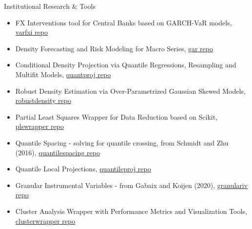 \documentclass[usegeometry, 10pt, a4paper]{cv} %
\begin{document}
\begin{rubriquetableau}[0.95\textwidth]{Institutional Research \& Tools}\\
  \vspace{-0.8cm}
  
\begin{itemize}
\item FX Interventions tool for Central Banks based on GARCH-VaR models, \href{https://github.com/romainlafarguette/varfxi}{varfxi repo} 
\item Density Forecasting and Risk Modeling for Macro Series, \href{https://github.com/IMFGAR/GaR}{gar repo}
\item Conditional Density Projection via Quantile Regressions, Resampling and Multifit Models, \href{https://github.com/romainlafarguette/gar}{quantproj repo}
\item Robust Density Estimation via Over-Parametrized Gaussian Skewed Models, \href{https://github.com/romainlafarguette/robustdensity}{robustdensity repo}
\item Partial Least Squares Wrapper for Data Reduction based on Scikit, \href{https://github.com/romainlafarguette/plswrapper}{plswrapper repo}
\item Quantile Spacing - solving for quantile crossing, from Schmidt and Zhu (2016), \href{https://github.com/romainlafarguette/quantilespacing}{quantilespacing repo}
\item Quantile Local Projections, \href{https://github.com/romainlafarguette/quantileproj}{quantileproj repo}
\item Granular Instrumental Variables - from Gabaix and Koijen (2020), \href{https://github.com/romainlafarguette/granulariv}{granulariv repo}
\item Cluster Analysis Wrapper with Performance Metrics and Visualization Tools, \href{https://github.com/romainlafarguette/clusterwrapper}{clusterwrapper repo}
\end{itemize}  

\end{rubriquetableau}

\end{document}
